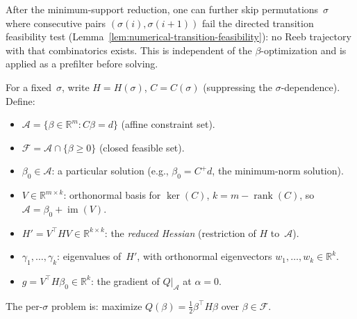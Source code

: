 \begin{remark}\label{rem:adjacency-pruning}
After the minimum-support reduction, one can further skip
permutations~$\sigma$ where consecutive pairs
$(\sigma(i), \sigma(i{+}1))$ fail the directed transition
feasibility test (Lemma~\ref{lem:numerical-transition-feasibility}):
no Reeb trajectory with that combinatorics exists.
This is independent of the $\beta$-optimization and is applied
as a prefilter before solving.
\end{remark}




\begin{remark}\label{rem:qp-setup}
For a fixed~$\sigma$, write $H = H(\sigma)$,
$C = C(\sigma)$ (suppressing the $\sigma$-dependence).
Define:
\begin{itemize}
  \item $\mathcal{A} = \{\beta \in \mathbb{R}^m : C\beta = d\}$
    \quad (affine constraint set).
  \item $\mathcal{F} = \mathcal{A} \cap \{\beta \geq 0\}$
    \quad (closed feasible set).
  \item $\beta_0 \in \mathcal{A}$: a particular solution
    (e.g., $\beta_0 = C^+ d$, the minimum-norm solution).
  \item $V \in \mathbb{R}^{m \times k}$: orthonormal basis for
    $\ker(C)$,\; $k = m - \operatorname{rank}(C)$,
    \;so $\mathcal{A} = \beta_0 + \operatorname{im}(V)$.
  \item $H' = V^\top H V \in \mathbb{R}^{k \times k}$:
    the \emph{reduced Hessian} (restriction of $H$ to~$\mathcal{A}$).
  \item $\gamma_1, \ldots, \gamma_k$: eigenvalues of~$H'$,
    with orthonormal eigenvectors $w_1, \ldots, w_k \in \mathbb{R}^k$.
  \item $g = V^\top H \beta_0 \in \mathbb{R}^k$:
    the gradient of $Q|_{\mathcal{A}}$ at $\alpha = 0$.
\end{itemize}
The per-$\sigma$ problem is:
maximize $Q(\beta) = \tfrac{1}{2}\beta^\top H \beta$
over $\beta \in \mathcal{F}$.
\end{remark}

